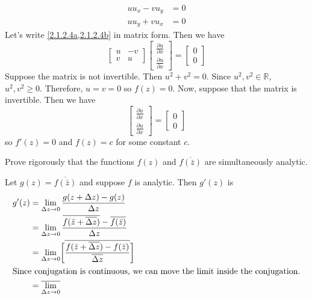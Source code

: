 \begin{exercise}
\begin{subequations}
    \begin{align}
      uu_x - vu_y & = 0\label{2.1.2.4a}\\
      uu_y + vu_x & = 0\label{2.1.2.4b}
    \end{align}
  \end{subequations}
  Let's write \cref{2.1.2.4a,2.1.2.4b} in matrix form.
  Then we have
  \[
  \begin{bmatrix}
    u & -v\\
    v & u
  \end{bmatrix}
  \begin{bmatrix}
    \frac{\partial u}{\partial x}\\
    \frac{\partial u}{\partial x}
  \end{bmatrix} =
  \begin{bmatrix}
    0\\
    0
  \end{bmatrix}
  \]
  Suppose the matrix is not invertible.
  Then \(u^2 + v^2 = 0\).
  Since \(u^2,v^2\in\mathbb{R}\), \(u^2,v^2\geq 0\).
  Therefore, \(u = v = 0\) so \(f(z) = 0\).
  Now, suppose that the matrix is invertible.
  Then we have
  \[
  \begin{bmatrix}
    \frac{\partial u}{\partial x}\\
    \frac{\partial u}{\partial x}
  \end{bmatrix} =
  \begin{bmatrix}
    0\\
    0
  \end{bmatrix}
  \]
  so \(f'(z) = 0\) and \(f(z) = c\) for some constant \(c\).
\item
  Prove rigorously that the functions \(f(z)\) and \(\overline{f(\bar{z})}\)
  are simultaneously analytic.
  \par\smallskip
  Let \(g(z) = \overline{f(\bar{z})}\) and suppose \(f\) is analytic.
  Then \(g'(z)\)  is
  \begin{align*}
    g'(z) & = \lim_{\Delta z\to 0}\frac{g(z + \Delta z) - g(z)}{\Delta z}\\
          & = \lim_{\Delta z\to 0}
            \frac{\overline{f(\bar{z} + \overline{\Delta z})} -
            \overline{f(\bar{z})}}{\Delta z}\\
          & = \lim_{\Delta z\to 0}\biggl[
            \overline{\frac{f(\bar{z} + \overline{\Delta z}) - f(\bar{z})}
            {\overline{\Delta z}}}\biggr]\\
    \intertext{Since conjugation is continuous, we can move the limit inside
    the conjugation.}
          & = \overline{\lim_{\Delta z\to 0}
}
\end{align*}
\end{exercise}
